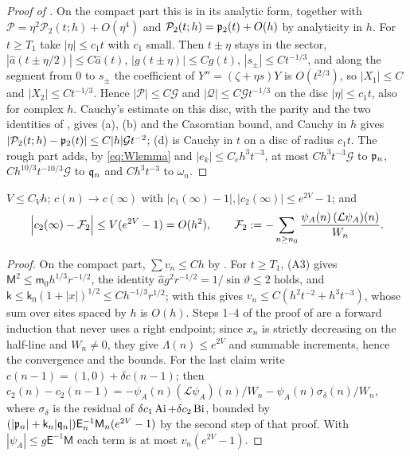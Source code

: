 \begin{proof}[Proof of ]
On the compact part this is  in its analytic form, together with
$\mathcal P=\eta^2\mathcal P_2(t;h)+O(\eta^4)$ and $\mathcal P_2(t;h)=\mathfrak{p}_2(t)+O(h)$ by analyticity in
$h$. For $t\ge T_1$ take $|\eta|\le c_1t$ with $c_1$ small. Then $t\pm\eta$ stays in the sector,
$|\hat a(t\pm\eta/2)|\le C\hat a(t)$, $|g(t\pm\eta)|\le Cg(t)$, $|s_\pm|\le Ct^{-1/3}$, and along the
segment from $0$ to $s_\pm$ the coefficient of $Y''=(\zeta+\eta s)Y$ is $O(t^{2/3})$, so
$|X_1|\le C$ and $|X_2|\le Ct^{-1/3}$. Hence $|\mathcal P|\le C\mathcal G$ and $|\mathcal Q|\le C\mathcal Gt^{-1/3}$ on the disc
$|\eta|\le c_1t$, also for complex $h$. Cauchy's estimate on this disc, with the parity and the
two identities of , gives (a), (b) and the Casoratian bound, and Cauchy in $h$
gives $|\mathcal P_2(t;h)-\mathfrak{p}_2(t)|\le C|h|\mathcal Gt^{-2}$; (d) is Cauchy in $t$ on a disc of radius $c_1t$.
The rough part adds, by \eqref{eq:Wlemma} and $|e_k|\le C_eh^3t^{-3}$, at most
$Ch^3t^{-3}\mathcal G$ to $\mathfrak{p}_n$, $Ch^{10/3}t^{-10/3}\mathcal G$ to $\mathfrak{q}_n$ and $Ch^3t^{-3}$ to $\omega_n$.
\end{proof}

\begin{lemma}\label{lem:forward}
$V\le C_Vh$; $c(n)\to c(\infty)$ with $|c_1(\infty)-1|,|c_2(\infty)|\le e^{2V}-1$; and
\[
  \Bigl|c_2(\infty)-\mathcal F_2\Bigr|\le V(e^{2V}-1)=O(h^2),\qquad
  \mathcal F_2:=-\sum_{n\ge n_0}\frac{\psi_A(n)\,(\mathcal L\psi_A)(n)}{W_n}.
\]
\end{lemma}

\begin{proof}
On the compact part, $\sum v_n\le Ch$ by . For $t\ge T_1$, (A3) gives
$\mathsf M^2\le\mathsf m_0h^{1/3}r^{-1/2}$, the identity $\hat ag^2r^{-1/2}=1/\sin\vartheta\le2$ holds, and
$\mathsf k\le\mathsf k_0(1+|x|)^{1/2}\le Ch^{-1/3}r^{1/2}$; with  this gives
$v_n\le C(h^2t^{-2}+h^3t^{-3})$, whose sum over sites spaced by $h$ is $O(h)$. Steps 1--4 of
the proof of  are a forward induction that never uses a right endpoint;
since $x_n$ is strictly decreasing on the half-line and $W_n\ne0$, they give
$\Lambda(n)\le e^{2V}$ and summable increments, hence the convergence and the bounds. For the
last claim write $c(n-1)=(1,0)+\delta c(n-1)$; then
$c_2(n)-c_2(n-1)=-\psi_A(n)(\mathcal L\psi_A)(n)/W_n-\psi_A(n)\sigma_\delta(n)/W_n$, where $\sigma_\delta$ is the
residual of $\delta c_1\operatorname{Ai}+\delta c_2\operatorname{Bi}$, bounded by
$(|\mathfrak{p}_n|+\mathsf k_n|\mathfrak{q}_n|)\mathsf E_n^{-1}\mathsf M_n(e^{2V}-1)$ by the second step of that proof. With
$|\psi_A|\le g\mathsf E^{-1}\mathsf M$ each term is at most $v_n(e^{2V}-1)$.
\end{proof}

